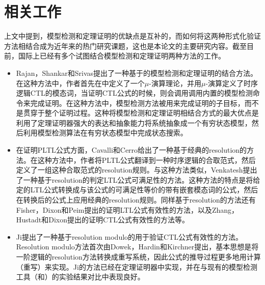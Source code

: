 \section{相关工作}
上文中提到，模型检测和定理证明的优缺点是互补的，而如何将这两种形式化验证方法相结合成为近年来的热门研究课题，这也是本论文的主要研究内容。截至目前，国际上已经有多个试图结合模型检测和定理证明两种方法的工作。
\begin{itemize}
	\item Rajan，Shankar和Srivas提出了一种基于的模型检测和定理证明的结合方法\cite{RajanSS95}。在这种方法中，作者首先在中定义了一个$\mu$-演算理论，并用$\mu$-演算定义了时序逻辑\textsf{CTL}的模态词，当证明\textsf{CTL}公式的时候，则会调用调用内置的模型检测命令来完成证明。在这种方法中，模型检测方法被用来完成证明的子目标，而不是贯穿于整个证明过程。这种将模型检测和定理证明相结合方式的最大优点是利用了定理证明器强大的表达和抽象能力将系统抽象成一个有穷状态模型，然后利用模型检测算法在有穷状态模型中完成状态搜索。
	\item 在证明\textsf{PLTL}公式方面，Cavalli和Cerro给出了一种基于经典的resolution的方法\cite{CavalliC84}。在这种方法中，作者将\textsf{PLTL}公式翻译到一种时序逻辑的合取范式，然后定义了一组这种合取范式的resolution规则。与这种方法类似，Venkatesh提出了一种基于resolution的判定\textsf{LTL}公式可满足性的方法\cite{Venkatesh85}。这种方法的特点是将给定的\textsf{LTL}公式转换成与该公式的可满足性等价的带有嵌套模态词的公式，然后在转换后的公式上应用经典的resolution规则。同样基于resolution的方法还有Fisher，Dixon和Peim提出的证明\textsf{LTL}公式有效性的方法\cite{FisherDP01}，以及Zhang，Hustadt和Dixon提出的证明\textsf{CTL}公式有效性的方法\cite{ZhangHD14}等。
	\item Ji提出了一种基于resolution modulo的用于验证\textsf{CTL}公式有效性的方法\cite{Ji15}。Resolution modulo方法首次由Dowek，Hardin和Kirchner提出\cite{DowekHK03,Dowek10}，基本思想是将一阶逻辑的resolution方法转换成重写系统，因此公式的推导过程更多地用计算（重写）来实现。Ji的方法已经在定理证明器中实现，并在与现有的模型检测工具（\nusmv{}和\verds{}）的实验结果对比中表现良好。
\end{itemize}
